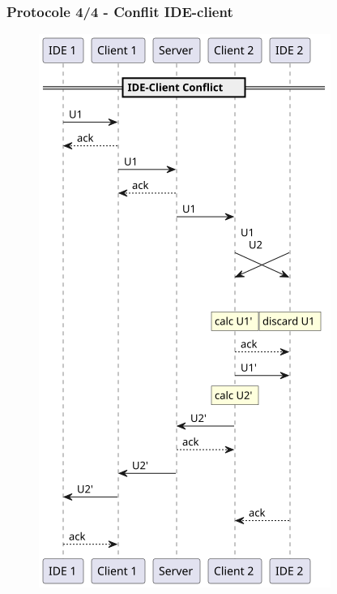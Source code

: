 \documentclass{beamer}
\begin{document}
\begin{frame}
    \frametitle{Protocole 4/4 - Conflit IDE-client}
    \begin{figure}
        \includegraphics[width=\textwidth,height=0.8\textheight,keepaspectratio]{diagrams/4.png}
    \end{figure}
\end{frame}
\end{document}
